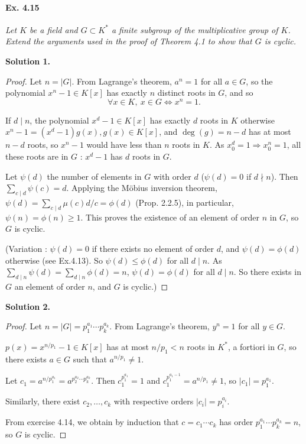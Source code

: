 \documentclass[11pt,a4paper]{article}
\begin{document}
\paragraph{Ex. 4.15}

{\it Let $K$ be a field and $G \subset K^*$ a finite subgroup of the multiplicative group of $K$.  Extend the arguments used in the proof of Theorem 4.1 to show that $G$ is cyclic.
}

\bigskip

 {\bf Solution 1.}

\begin{proof}
Let $n = \vert G \vert$. From Lagrange's theorem, $a^n = 1$ for all $a \in G$, so the polynomial $x^n-1\in K[x] $ has exactly $n$  distinct roots in $G$, and so
$$\forall x \in K,\ x \in G \iff x^n=1.$$

If $d \mid n$, the polynomial $x^d-1 \in K[x]$ has exactly $d$ roots in $K$ otherwise $x^n-1 = (x^d-1) g(x), g(x) \in K[x]$, and $\deg(g) = n-d$ has at most $n-d$ roots, so $x^n - 1$ would have less than $n$ roots in $K$. As $x_0^d = 1 \Rightarrow x_0^n = 1$, all these roots are in $G$ : $x^d - 1$ has $d$ roots in $G$.

Let $\psi(d)$ the number of elements in $G$ with order $d$ ($\psi(d) = 0$ if $d \nmid n$). Then $\sum_{c\mid d} \psi(c) = d$. Applying the M\"{o}bius inversion theorem, $\psi(d) = \sum_{c\mid d} \mu(c) d/c=\phi(d)$ (Prop. 2.2.5), in particular, $\psi(n) = \phi(n)\geq 1$. This proves the existence of an element of order $n$ in $G$, so $G$ is cyclic.

(Variation : $\psi(d) = 0$ if there exists no element of order $d$, and $\psi(d) = \phi(d)$ otherwise (see Ex.4.13). So $\psi(d) \leq \phi(d)$ for all $d\mid n$. As $\sum_{d\mid n} \psi(d) = \sum_{d\mid n} \phi(d) = n$, $\psi(d) = \phi(d)$ for all $d\mid n$. So there exists in $G$ an element of order $n$, and $G$ is cyclic.)
\end{proof}

\bigskip

{\bf Solution 2.}
\begin{proof}
Let $n = \vert G \vert = p_1^{a_1}\cdots p_k^{a_k}$. From Lagrange's theorem, $y^n = 1$ for all $y \in G$.

$p(x) = x^{n/p_1} - 1 \in K[x]$ has at most $n/p_1 < n$ roots in $K^*$, a fortiori in $G$, so there exists $a \in G$ such that $a^{n/p_1} \neq 1$.

Let $c_1 = a^{n/p_1^{a_1}} = a^{p_2^{a_2}\cdots p_k^{a_k}}$. Then $c_1^{p_1^{a_1}} = 1$ and $c_1^{p_1^{a_1-1}} = a^{n/p_1} \neq 1$, so $\vert c_1 \vert = p_1^{a_1} $.

Similarly, there exist $c_2,\ldots,c_k$ with respective orders $\vert c_i \vert = p_i^{a_i}$.

From exercise 4.14, we obtain by induction that $c =c_1\cdots c_k$ has order $ p_1^{a_1}\cdots p_k^{a_k} = n$, so $G$ is cyclic.
\end{proof}
\end{document}
